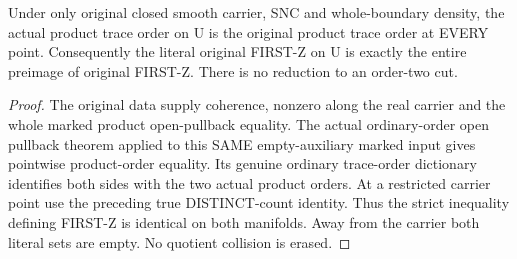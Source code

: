 \begin{theorem}
\label{hir:sharp-original-first-distinct-defect-open-naturality}
\leanok
Under only original closed smooth carrier, SNC and whole-boundary density, the
actual product trace order on U is the original product trace order at EVERY
point. Consequently the literal original FIRST-Z on U is exactly the entire
preimage of original FIRST-Z. There is no reduction to an order-two cut.
\end{theorem}
\begin{proof}
The original data supply coherence, nonzero along the real carrier and the
whole marked product open-pullback equality. The actual ordinary-order open
pullback theorem applied to this SAME empty-auxiliary marked input gives
pointwise product-order equality. Its genuine ordinary trace-order dictionary
identifies both sides with the two actual product orders. At a restricted
carrier point use the preceding true DISTINCT-count identity. Thus the strict
inequality defining FIRST-Z is identical on both manifolds. Away from the
carrier both literal sets are empty. No quotient collision is erased.
\end{proof}

